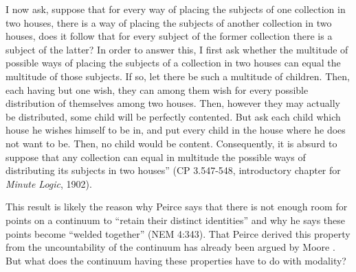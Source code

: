 {I now ask, suppose that for every way of placing the subjects of one collection in two houses, there is a way of placing the subjects of another collection in two houses, does it follow that for every subject of the former collection there is a subject of the latter? In order to answer this, I first ask whether the multitude of possible ways of placing the subjects of a collection in two houses can equal the multitude of those subjects. If so, let there be such a multitude of children. Then, each having but one wish, they can among them wish for every possible distribution of themselves among two houses. Then, however they may actually be distributed, some child will be perfectly contented. But ask each child which house he wishes himself to be in, and put every child in the house where he does not want to be. Then, no child would be content. Consequently, it is absurd to suppose that any collection can equal in multitude the possible ways of distributing its subjects in two houses'' (CP 3.547-548, introductory chapter for \textit{Minute Logic}, 1902).} 

This result is likely the reason why Peirce says that there is not enough room for points on a continuum to ``retain their distinct identities'' and why he says these points become ``welded together'' (NEM 4:343). That Peirce derived this property from the uncountability of the continuum has already been argued by Moore \citeyearpar{moore_genesis_2007}. But what does the continuum having these properties have to do with modality? 

